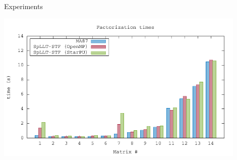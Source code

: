 \documentclass{beamer}
\begin{document}
\begin{frame}{Experiments}
  
  
  \begin{center}
    \includegraphics[width=0.9\textwidth]{data/cmp_facto_stf}


\end{center}
\end{frame}
\end{document}
